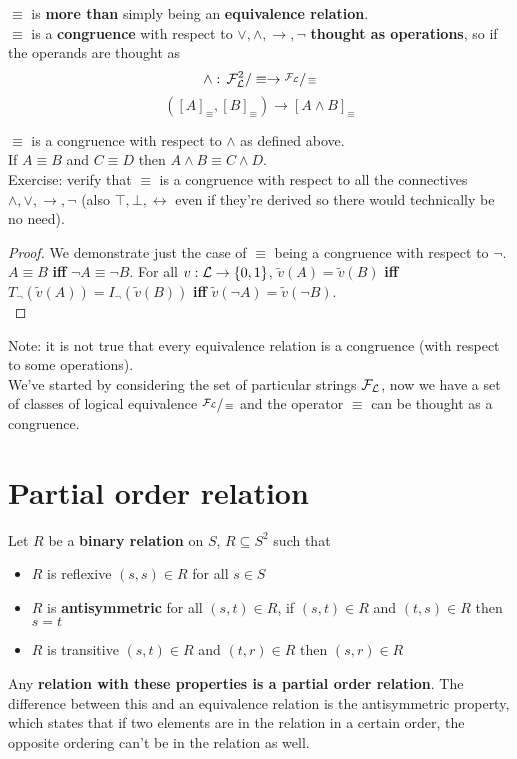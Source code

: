 	$\equiv$ is \textbf{more than} simply being an \textbf{equivalence relation}. \\

	$\equiv$ is a \textbf{congruence} with respect to $\vee, \wedge, \rightarrow, \neg$ \textbf{thought as operations}, so if the operands are thought as
	$$ \wedge : \, \mathcal{F}_\mathcal{L}^2/\equiv \rightarrow \sfrac{\mathcal{F}_\mathcal{L}}{\equiv} $$
	$$ ([A]_\equiv, [B]_\equiv) \rightarrow [A \wedge B]_\equiv $$

	$\equiv$ is a congruence with respect to $\wedge$ as defined above.\\
	If $A \equiv B$ and $C \equiv D$ then $A \wedge B \equiv C \wedge D$.\\

	Exercise: verify that $\equiv$ is a congruence with respect to all the connectives $\wedge, \vee, \rightarrow, \neg$ (also $\top, \bot, \leftrightarrow$ even if they're derived so there would technically be no need).\\

	\begin{proof}
		We demonstrate just the case of $\equiv$ being a congruence with respect to $\neg$.\\
		$A \equiv B$ \textbf{iff} $\neg A \equiv \neg B$. For all $v: \mathcal{L} \rightarrow \{0,1\}$, $\tilde{v}(A) = \tilde{v}(B)$ \textbf{iff} $T_\neg (\tilde{v}(A)) = I_\neg (\tilde{v}(B))$ \textbf{iff} $\tilde{v}(\neg A) = \tilde{v}(\neg B)$.\\
	\end{proof}

	Note: it is not true that every equivalence relation is a congruence (with respect to some operations).\\

	We've started by considering the set of particular strings $\mathcal{F}_\mathcal{L}$, now we have a set of classes of logical equivalence $\sfrac{\mathcal{F}_\mathcal{L}}{\equiv}$ and the operator $\equiv$ can be thought as a congruence.\\

	\newpage

	\section{Partial order relation}

	Let $R$ be a \textbf{binary relation} on $S$, $R \subseteq S^2$ such that
	\begin{itemize}
		\item $R$ is reflexive $(s, s) \in R$ for all $s \in S$
		\item $R$ is \textbf{antisymmetric} for all $(s,t) \in R$, if $(s,t) \in R$ and $(t,s) \in R$ then $s = t$
		\item $R$ is transitive $(s,t) \in R$ and $(t,r) \in R$ then $(s,r) \in R$
	\end{itemize}
	Any \textbf{relation with these properties is a partial order relation}. The difference between this and an equivalence relation is the antisymmetric property, which states that if two elements are in the relation in a certain order, the opposite ordering can't be in the relation as well.\\

